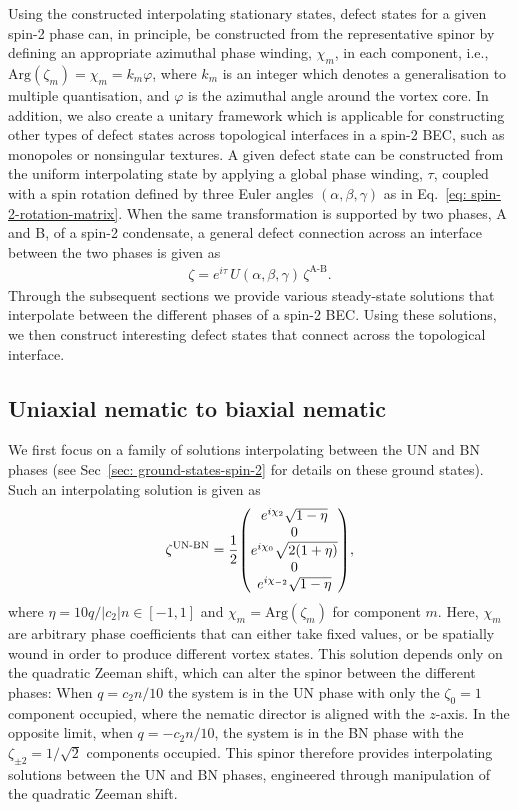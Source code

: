 Using the constructed interpolating stationary states, defect states for a given
spin-2 phase can, in principle, be constructed from
the representative spinor by defining an appropriate azimuthal phase winding,
\(\chi_m \), in each component, i.e., \(\text{Arg}(\zeta_m) =\chi_m =
k_m\varphi \), where \(k_m\) is an integer which denotes a generalisation to
multiple quantisation, and \(\varphi \) is the azimuthal angle around the vortex
core.
In addition, we also create a unitary framework which is applicable for
constructing other types of defect states across topological interfaces in a
spin-2 BEC, such as monopoles or nonsingular textures.
A given defect state can be constructed from the uniform interpolating state by
applying a global phase winding, \(\tau \), coupled with a spin rotation defined
by three Euler angles \((\alpha, \beta, \gamma)\) as in
Eq.~\eqref{eq: spin-2-rotation-matrix}.
When the same transformation is supported by two phases, A and B, of a spin-2
condensate, a general defect connection across an interface between the two
phases is given as
\begin{align}\label{eq: general-defect-interface}
    \zeta = e^{i\tau}\,U(\alpha, \beta, \gamma)\,\zeta^\text{A-B}.
\end{align}
Through the subsequent sections we provide various steady-state solutions that
interpolate between the different phases of a spin-2 BEC.\@
Using these solutions, we then construct interesting defect states that connect
across the topological interface.

\subsection{Uniaxial nematic to biaxial nematic}\label{subsec: UN-BN-defects}
We first focus on a family of solutions interpolating between the UN and BN
phases (see Sec~\ref{sec: ground-states-spin-2} for details on these ground
states).
Such an interpolating solution is given as
\begin{align}\label{eq: UN-BN-interpolating-spinor}
    \zeta^\text{UN-BN} = \frac{1}{2}\mqty(
    e^{i\chi_2}\sqrt{1 - \eta} \\
    0 \\
    e^{i\chi_0}\sqrt{2(1+\eta)} \\
    0 \\
    e^{i\chi_{-2}}\sqrt{1 - \eta}
    ),
\end{align}
where \(\eta = 10q /|c_2|n \in [-1, 1]\) and \(\chi_m = \text{Arg}(\zeta_m)\)
for component \(m\).
Here, \(\chi_m\) are arbitrary phase coefficients that can either take fixed
values, or be spatially wound in order to produce different vortex states.
This solution depends only on the quadratic Zeeman shift, which can alter the
spinor between the different phases: When \(q = c_2n / 10\) the system is in the
UN phase with only the \(\zeta_0=1\) component occupied, where the nematic
director is aligned with the \(z\)-axis.
In the opposite limit, when \(q = -c_2n/10\), the system is in the
BN phase with the \(\zeta_{\pm 2} = 1/\sqrt{2}\) components occupied.
This spinor therefore provides interpolating solutions between the UN and BN
phases, engineered through manipulation of the quadratic Zeeman shift.

